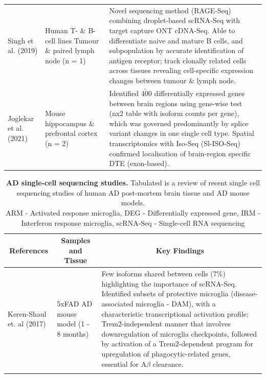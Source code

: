 \begin{landscape}
\begin{longtable}[c]{p{4cm}p{4cm}p{18cm}}
		\centering Singh et al. (2019) \cite{Singh2019} &
		\centering Human T- \& B-cell lines \newline Tumour \& paired lymph node (n = 1)  &
		\tabitem Novel sequencing method (RAGE-Seq) combining droplet-based scRNA-Seq with target capture ONT cDNA-Seq.\newline 
		\tabitem Able to differentiate naive and mature B cells, and subpopulation by accurate identification of antigen receptor; track clonally related cells across tissues revealing cell-specific expression changes between tumour \& lymph node. \\
		\hdashline[0.5pt/5pt]
		
		\centering Joglekar et al. (2021) \cite{Joglekar2021} &
		\centering Mouse hippocampus \& prefrontal cortex (n = 2) &
		\tabitem Identified $\tilde{400}$ differentially expressed genes between brain regions using gene-wise test (nx2 table with isoform counts per gene), which was governed predominantly by splice variant changes in one single cell type. \newline 
		\tabitem Spatial transcriptomics with Iso-Seq (Sl-ISO-Seq) confirmed localisation of brain-region specific DTE (exon-based). 
		\\* \bottomrule
	\end{longtable}
	
	\clearpage
	\begin{longtable}[c]{p{4cm}p{4cm}p{18cm}}
		\caption[AD single-cell sequencing studies]%
		{\textbf{AD single-cell sequencing studies.} Tabulated is a review of recent single cell sequencing studies of human AD post-mortem brain tissue and AD mouse models. \newline ARM - Activated response microglia, DEG - Differentially expressed gene, IRM - Interferon response microglia, scRNA-Seq - Single-cell RNA sequencing}
		\label{tab: longread_AD_advancedstudies}\\
		
		\toprule
		\multicolumn{1}{c}{References} &
		\multicolumn{1}{c}{Samples and Tissue} &
		\multicolumn{1}{c}{Key Findings} \\* \midrule
		\endfirsthead
		\endhead
		\bottomrule
		\endfoot
		\endlastfoot
		\centering Keren-Shaul et. al (2017)\cite{Keren-Shaul2017} &
		\centering 5xFAD AD mouse model (1 - 8 months) &
		\tabitem Few isoforms shared between cells (7\%) highlighting the importance of scRNA-Seq. \newline
		\tabitem Identified subsets of protective microglia (disease-associated microglia - DAM), with a characteristic transcriptional activation profile: Trem2-independent manner that involves downregulation of microglia checkpoints, followed by activation of a Trem2-dependent program for upregulation of phagocytic-related genes, essential for A$\beta$ clearance.  \\
		\hdashline[0.5pt/5pt]	
		

\end{longtable}
\end{landscape}
